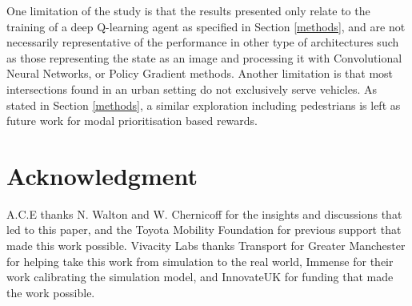 \documentclass[conference]{IEEEtran}
\begin{document}
One limitation of the study is that the results presented only relate to the training of a deep Q-learning agent as specified in Section \ref{methods}, and are not necessarily representative of the performance in other type of architectures such as those representing the state as an image and processing it with Convolutional Neural Networks, or Policy Gradient methods.
Another limitation is that most intersections found in an urban setting do not exclusively serve vehicles. As stated in Section \ref{methods}, a similar exploration including pedestrians is left as future work for modal prioritisation based rewards.



\section*{Acknowledgment}

A.C.E thanks N. Walton and W. Chernicoff for the insights and discussions that led to this paper, and the Toyota Mobility Foundation for previous support that made this work possible. Vivacity Labs thanks Transport for Greater Manchester for helping take this work from simulation to the real world, Immense for their work calibrating the simulation model, and InnovateUK for funding that made the work possible.

\addtolength{\textheight}{-7.8cm} 
\end{document}
